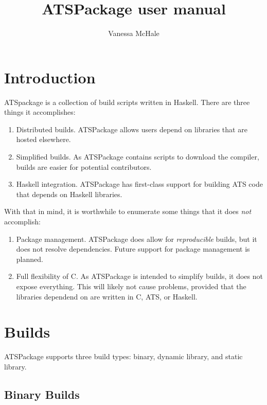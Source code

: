 \documentclass{article}
\begin{document}
\title{ATSPackage user manual}
\author{Vanessa McHale}
\maketitle

\tableofcontents

\section{Introduction}

ATSpackage is a collection of build scripts written in Haskell. There are three
things it accomplishes:

\begin{enumerate}
  \item Distributed builds. ATSPackage allows users depend on libraries that are
    hosted elsewhere.
  \item Simplified builds. As ATSPackage contains scripts to download the
    compiler, builds are easier for potential contributors.
  \item Haskell integration. ATSPackage has first-class support for building ATS
    code that depends on Haskell libraries. 
\end{enumerate}

With that in mind, it is worthwhile to enumerate some things that it does
\textit{not} accomplish:

\begin{enumerate}
  \item Package management. ATSPackage does allow for \textit{reproducible}
    builds, but it does not resolve dependencies. Future support for package
    management is planned.
  \item Full flexibility of C. As ATSPackage is intended to simplify builds, it
    does not expose everything. This will likely not cause problems, provided
    that the libraries dependend on are written in C, ATS, or Haskell.
\end{enumerate}

\section{Builds}

ATSPackage supports three build types: binary, dynamic library, and static
library.

\subsection{Binary Builds}
\end{document}
